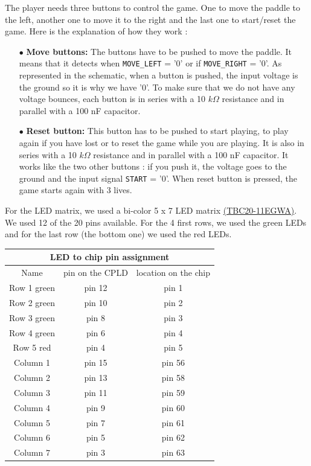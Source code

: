 The player needs three buttons to control the game. One to move the paddle to the left, another one to move it to the right and the last one to start/reset the game. Here is the explanation of how they work :  \\
\begin{itemize}

    \item[$\bullet$] \textbf{Move buttons:} The buttons have to be pushed to move the paddle. It means that it detects when \texttt{MOVE\_LEFT} = '0' or if \texttt{MOVE\_RIGHT} = '0'. As represented in the schematic, when a button is pushed, the input voltage is the ground so it is why we have '0'. To make sure that we do not have any voltage bounces, each button is in series with a 10 $k\Omega$ resistance and in parallel with a 100 nF capacitor. \\

    \item[$\bullet$] \textbf{Reset button:} This button has to be pushed to start playing, to play again if you have lost or to reset the game while you are playing. It is also in series with a 10 $k\Omega$ resistance and in parallel with a 100 nF capacitor. It works like the two other buttons : if you push it, the voltage goes to the ground and the input signal \texttt{START} = '0'. When reset button is pressed, the game starts again with 3 lives. \\
\end{itemize}

For the LED matrix, we used a bi-color 5 x 7 LED matrix \href{https://www.kingbrightusa.com/images/catalog/SPEC/TBC20-11EGWA.pdf}{(TBC20-11EGWA)}. We used 12 of the 20 pins available. For the 4 first rows, we used the green LEDs and for the last row (the bottom one) we used the red LEDs.

\begin{center}
\begin{tabular}{|c|c|c|}
\hline
\multicolumn{3}{|c|}{LED to chip pin assignment}\\
\hline
Name & pin on the CPLD & location on the chip \\
\hline
Row 1 green & pin 12 & pin 1 \\
\hline
Row 2 green & pin 10 &  pin 2\\
\hline
Row 3 green  & pin 8 &  pin 3\\
\hline
Row 4 green & pin 6 & pin 4\\
\hline
Row 5 red & pin 4 & pin 5\\
\hline
Column 1 & pin 15 & pin 56\\
\hline
Column 2 & pin 13 & pin 58\\
\hline
Column 3 & pin 11 & pin 59\\
\hline
Column 4 & pin 9 & pin 60 \\
\hline
Column 5 & pin 7 & pin 61\\
\hline
Column 6 & pin 5 & pin 62\\
\hline
Column 7 & pin 3 & pin 63\\

\hline
\end{tabular}
\label{table_1}
\end{center}